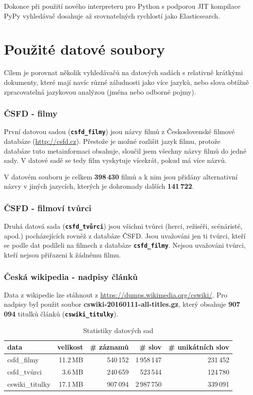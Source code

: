 \documentclass[11pt,letterpaper,oneside,openright]{book}
\newcommand{\bftt}[1]{\texttt{\textbf{#1}}}
\begin{document}
Dokonce při použití nového interpreteru pro Python s podporou JIT
kompilace PyPy vyhledávač dosahuje až srovnatelných rychlostí jako
Elasticsearch.


\section{Použité datové soubory}
Cílem je porovnat několik vyhledávačů na datových sadách s relativně krátkými
dokumenty, které mají navíc různé záludnosti jako více jazyků, nebo slova
obtížně zpracovatelná jazykovou analýzou (jména nebo odborné pojmy).

\subsubsection{ČSFD - filmy}
První datovou sadou (\bftt{csfd\_filmy}) jsou názvy filmů z Československé
filmové databáze (\url{http://csfd.cz}). Přestože je možné rozlišit jazyk
filmu, protože databáze tuto metainformaci obsahuje, sloučil jsem všechny názvy
filmů do jedné sady. V datové sadě se tedy film vyskytuje vícekrát, pokud má
více názvů.

V datovém souboru je celkem \textbf{398\,430} filmů a k nim jsou přidány
alternativní názvy v jiných jazycích, kterých je dohromady dalších
\textbf{141\,722}.

\subsubsection{ČSFD - filmoví tvůrci}
Druhá datová sada (\bftt{csfd\_tvůrci}) jsou všichni tvůrci (herci, režiséři,
scénáristé, apod.) pocházejících rovněž z databáze ČSFD. Jsou uvažováni jen ti
tvůrci, kteří se podle dat podíleli na filmech z databáze \bftt{csfd\_filmy}.
Nejsou uvažováni tvůrci, kteří nejsou přiřazeni k žádnému filmu.

\subsubsection{Česká wikipedia - nadpisy článků}
Data z wikipedie lze stáhnout z \url{https://dumps.wikimedia.org/cswiki/}. Pro
nadpisy byl použit soubor \textbf{cswiki-20160111-all-titles.gz}, který
obsahuje \textbf{907\,094} titulků článků (\bftt{cswiki\_titulky}).


\mbox{}
\begin{tt}
\begin{table}[H]
\centering
\begin{tabulary}{\textwidth}{LRRRR}
\textbf{data} & \textbf{velikost} & \textbf{\# záznamů} & \textbf{\# slov} & \textbf{\# unikátních slov} \\
\hline
csfd\_filmy     & 11.2\,MB & 540\,152 & 1\,958\,147 & 231\,452 \\
csfd\_tvůrci    & 3.6\,MB  & 240\,659 & 523\,544    & 124\,780 \\
cswiki\_titulky & 17.1\,MB & 907\,094 & 2\,987\,750 & 339\,091 \\
\hline
\end{tabulary}
\caption{Statistiky datových sad}
\label{tab:data_stats}
\end{table}
\end{tt}
\end{document}
